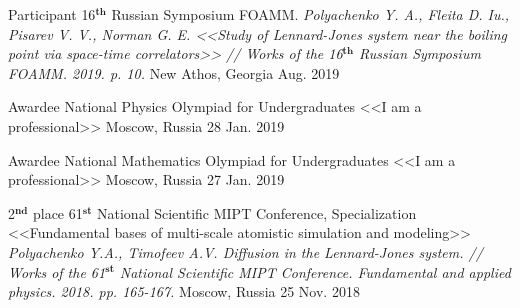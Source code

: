 
\begin{cvhonors}

  \cvhonor
    {Participant} %
    {16$^{\textbf{th}}$ Russian Symposium FOAMM. \newline \textit{Polyachenko Y. A., Fleita D. Iu., Pisarev V. V., Norman G. E. <<Study of Lennard-Jones system near the boiling point via space-time correlators>> // Works of the 16$^{\textbf{th}}$ Russian Symposium FOAMM. 2019. p. 10.}} %
    {New Athos, Georgia} %
    {Aug. 2019 \vspace{15pt}} %
    
    
  \cvhonor
    {Awardee} %
    {National Physics Olympiad for Undergraduates <<I am a professional>>} %
    {Moscow, Russia} %
    {28 Jan. 2019 \vspace{5pt}} %
    

    
  \cvhonor
    {Awardee} %
    {National Mathematics Olympiad for Undergraduates <<I am a professional>>} %
    {Moscow, Russia} %
    {27 Jan. 2019 \vspace{5pt}} %
    
   \vspace{5pt}    
    
  \cvhonor
    {2$^{\textbf{nd}}$ place} %
    {61$^{\textbf{st}}$ National Scientific MIPT Conference, Specialization <<Fundamental bases of multi-scale atomistic simulation and modeling>> \newline \textit{Polyachenko Y.A., Timofeev A.V. Diffusion in the Lennard-Jones system. // Works of the 61$^{\textbf{st}}$ National Scientific MIPT Conference. Fundamental and applied physics. 2018. pp. 165-167.}} %
    {Moscow, Russia} %
    {25 Nov. 2018 \vspace{10pt}} %
    

\end{cvhonors}

